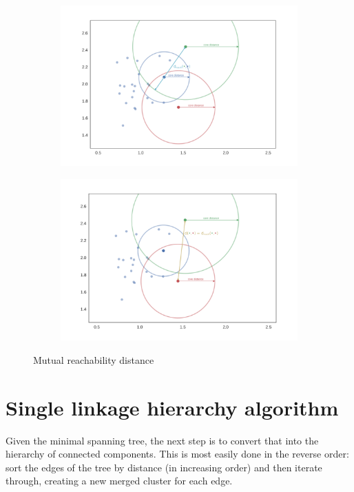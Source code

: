 \documentclass{article}
\begin{document}
\begin{figure}[h!]
	\begin{subfigure}{.5\textwidth}
		\centering
		\includegraphics[width=\linewidth]{dis_figure1.png}
		\caption{}
	\end{subfigure}%
	\begin{subfigure}{.5\textwidth}
		\centering
		\includegraphics[width=\linewidth]{dis_figure2.png}
		\caption{}
	\end{subfigure}
	\caption{Mutual reachability distance}
\end{figure}


\section{Single linkage hierarchy algorithm}

Given the minimal spanning tree, the next step is to convert that into the hierarchy of connected components. This is most easily done in the reverse order: sort the edges of the tree by distance (in increasing order) and then iterate through, creating a new merged cluster for each edge. 
\end{document}
